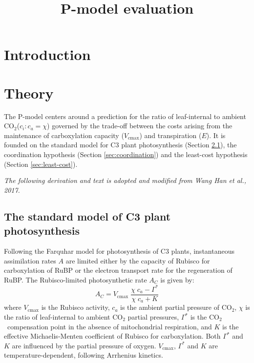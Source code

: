 \documentclass{myreport}
\newcommand{\coo}{CO$_2$}
\begin{document}
\pagestyle{headings}

% 

\title{P-model evaluation}

\maketitle



\section{Introduction}

\section{Theory}

The P-model centers around a prediction for the ratio of leaf-internal to ambient \coo ($c_i : c_a = \chi$) governed by the trade-off between the costs arising from the maintenance of carboxylation capacity ($V_{\mathrm{cmax}}$) and transpiration ($E$). 
It is founded on the standard model for C3 plant photosynthesis (Section \ref{sec:farquhar}), the coordination hypothesis (Section \ref{sec:coordination}) and the least-cost hypothesis (Section \ref{sec:least-cost}).

\textit{The following derivation and text is adopted and modified from Wang Han et al., 2017.}\\

\subsection{The standard model of C3 plant photosynthesis}
\label{sec:farquhar}
Following the Farquhar model for photosynthesis of C3 plants, instantaneous assimilation rates $A$ are limited either by the capacity of Rubisco for carboxylation of RuBP or the electron transport rate for the regeneration of RuBP. 
The Rubisco-limited photosynthetic rate $A_C$ is given by:
\begin{equation}
\label{eq:rubiscolimited}
    A_C = V_{\mathrm{cmax}} \; \frac{\chi\;c_a-\Gamma^{\ast}}{\chi\;c_a + K}
\end{equation}
where $V_{\mathrm{cmax}}$ is the Rubisco activity, $c_a$ is the ambient partial pressure of CO$_2$, $\chi$ is the ratio of leaf-internal to ambient CO$_2$ partial pressures, $\Gamma^{\ast}$ is the \coo\ compensation point in the absence of mitochondrial respiration, and $K$ is the effective Michaelis-Menten coefficient of Rubisco for carboxylation. 
Both $\Gamma^{\ast}$ and $K$ are influenced by the partial pressure of oxygen. 
$V_{\mathrm{cmax}}$, $\Gamma^{\ast}$ and $K$ are temperature-dependent, following Arrhenius kinetics.
\end{document}
